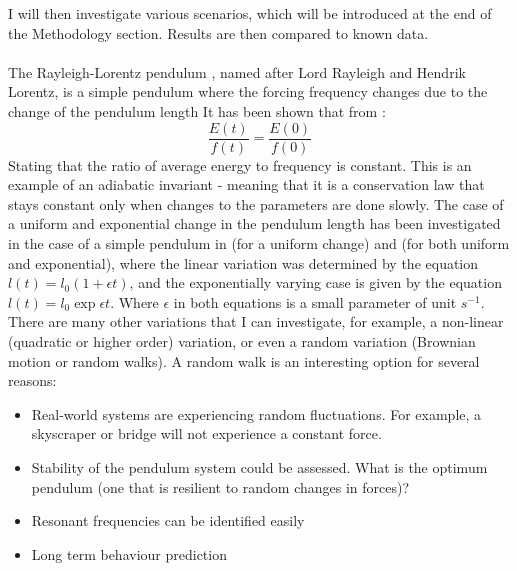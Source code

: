 \documentclass[10pt, twocolumn]{article}
\begin{document}
I will then investigate various scenarios, which will be introduced at the end of the Methodology section. Results are then compared to known data.
\\
\\
The Rayleigh-Lorentz pendulum \cite{Rayleigh1902}, named after Lord Rayleigh and Hendrik Lorentz, is a simple pendulum where the forcing frequency changes due to the change of the pendulum length
It has been shown that from \cite{Rayleigh1902}:
\begin{equation}
    \frac{E(t)}{f(t)} = \frac{E(0)}{f(0)}
    \label{adiabatic}
\end{equation}
Stating that the ratio of average energy to frequency is constant. This is an example of an adiabatic invariant - meaning that it is a conservation law that stays constant only when changes to the parameters are done slowly. The case of a uniform and exponential change in the pendulum length has been investigated in the case of a simple pendulum in \cite{Brearley1966, Werner1969, Ross1979} (for a uniform change) and \cite{SanchezZoido2013} (for both uniform and exponential), where the linear variation was determined by the equation $l(t) = l_0 (1 + \epsilon{t})$, and the exponentially varying case is given by the equation $l(t) = l_0\exp{\epsilon t}$. Where $\epsilon$ in both equations is a small parameter of unit $s^{-1}$. There are many other variations that I can investigate, for example, a non-linear (quadratic or higher order) variation, or even a random variation (Brownian motion or random walks). A random walk is an interesting option for several reasons:
\begin{itemize}
    \item Real-world systems are experiencing random fluctuations. For example, a skyscraper or bridge will not experience a constant force.
    \item Stability of the pendulum system could be assessed. What is the optimum pendulum (one that is resilient to random changes in forces)?
    \item Resonant frequencies can be identified easily
    \item Long term behaviour prediction
\end{itemize}
\end{document}
